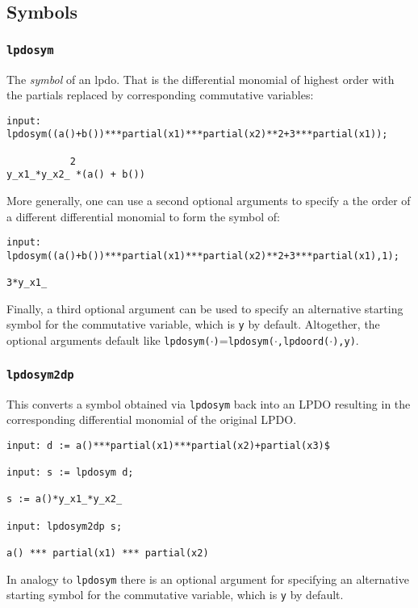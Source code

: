 \documentclass[a4paper]{article}
\begin{document}
\subsection{Symbols}
\subsubsection{\texttt{lpdosym}}
The \emph{symbol} of an lpdo. That is the differential monomial of
highest order with the partials replaced by corresponding commutative
variables:

\begin{footnotesize}
\begin{verbatim}
input: lpdosym((a()+b())***partial(x1)***partial(x2)**2+3***partial(x1));

           2
y_x1_*y_x2_ *(a() + b())
\end{verbatim}
\end{footnotesize}
More generally, one can use a second optional arguments to specify a
the order of a different differential monomial to form the symbol of:

\begin{footnotesize}
\begin{verbatim}
input: lpdosym((a()+b())***partial(x1)***partial(x2)**2+3***partial(x1),1);

3*y_x1_
\end{verbatim}
\end{footnotesize}
Finally, a third optional argument can be used to specify an
alternative starting symbol for the commutative variable, which is
\texttt{y} by default. Altogether, the optional arguments default like
\texttt{lpdosym($\cdot$)}=\texttt{lpdosym($\cdot$,lpdoord($\cdot$),y)}.

\subsubsection{\texttt{lpdosym2dp}}
This converts a symbol obtained via \texttt{lpdosym} back into an LPDO
resulting in the corresponding differential monomial of the original
LPDO.

\begin{footnotesize}
\begin{verbatim}
input: d := a()***partial(x1)***partial(x2)+partial(x3)$

input: s := lpdosym d;

s := a()*y_x1_*y_x2_

input: lpdosym2dp s;

a() *** partial(x1) *** partial(x2)
\end{verbatim}
\end{footnotesize}
In analogy to \texttt{lpdosym} there is an optional argument for
specifying an alternative starting symbol for the commutative
variable, which is \texttt{y} by default.
\end{document}
